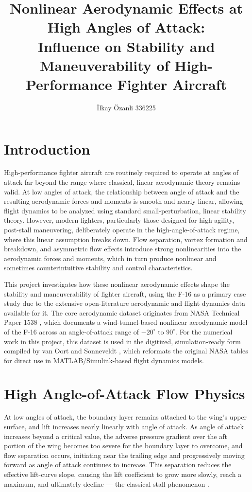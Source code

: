 \documentclass[
bindingoffset=5mm,  %
footnoteindent=3mm, %
hyphenation=true    %
]{src/wut-thesis}
\title{
	Nonlinear Aerodynamic Effects at High Angles of Attack: \\
	Influence on Stability and Maneuverability of High-Performance Fighter Aircraft
}
\author{İlkay Özanli 336225}
\date{\the\year}
\begin{document}
	\maketitle
	\newpage
	\tableofcontents
	\newpage
	
	\section{Introduction}
	
	High-performance fighter aircraft are routinely required to operate at angles of attack far beyond the range where classical, linear aerodynamic theory remains valid. At low angles of attack, the relationship between angle of attack and the resulting aerodynamic forces and moments is smooth and nearly linear, allowing flight dynamics to be analyzed using standard small-perturbation, linear stability theory. However, modern fighters, particularly those designed for high-agility, post-stall maneuvering, deliberately operate in the high-angle-of-attack regime, where this linear assumption breaks down. Flow separation, vortex formation and breakdown, and asymmetric flow effects introduce strong nonlinearities into the aerodynamic forces and moments, which in turn produce nonlinear and sometimes counterintuitive stability and control characteristics.
	
	This project investigates how these nonlinear aerodynamic effects shape the stability and maneuverability of fighter aircraft, using the F-16 as a primary case study due to the extensive open-literature aerodynamic and flight dynamics data available for it. The core aerodynamic dataset originates from NASA Technical Paper 1538 \cite{nguyen1979}, which documents a wind-tunnel-based nonlinear aerodynamic model of the F-16 across an angle-of-attack range of $-20^{\circ}$ to $90^{\circ}$. For the numerical work in this project, this dataset is used in the digitized, simulation-ready form compiled by van Oort and Sonneveldt \cite{vanoort2006}, which reformats the original NASA tables for direct use in MATLAB/Simulink-based flight dynamics models.
	
	
	\section{High Angle-of-Attack Flow Physics}
	
 At low angles of attack, the boundary layer remains attached to the wing's upper surface, and lift increases nearly linearly with angle of attack. As angle of attack increases beyond a critical value, the adverse pressure gradient over the aft portion of the wing becomes too severe for the boundary layer to overcome, and flow separation occurs, initiating near the trailing edge and progressively moving forward as angle of attack continues to increase. This separation reduces the effective lift-curve slope, causing the lift coefficient to grow more slowly, reach a maximum, and ultimately decline --- the classical stall phenomenon \cite{mason2006}.
\end{document}
